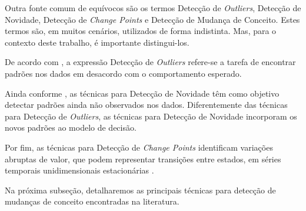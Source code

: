 \documentclass[qual, classic, a4paper]{ufbathesis}
\begin{document}
Outra fonte comum de equívocos são os termos Detecção de \textit{Outliers}, Detecção de Novidade, Detecção de \textit{Change Points} e Detecção de Mudança de Conceito.
Estes termos são, em muitos cenários, utilizados de forma indistinta.
Mas, para o contexto deste trabalho, é importante distingui-los.

De acordo com \cite{Chandola:2009:ADS:1541880.1541882}, a expressão Detecção de \textit{Outliers} refere-se a tarefa de encontrar padrões nos dados em desacordo com o comportamento esperado.

Ainda conforme \cite{Chandola:2009:ADS:1541880.1541882}, as técnicas para Detecção de Novidade têm como objetivo detectar padrões ainda não observados nos dados.
Diferentemente das técnicas para Detecção de \textit{Outliers}, as técnicas para Detecção de Novidade incorporam os novos padrões ao modelo de decisão.



Por fim, as técnicas para Detecção de \textit{Change Points} identificam variações abruptas de valor, que podem representar transições entre estados, em séries temporais unidimensionais estacionárias \cite{Aminikhanghahi:2017:SMT:3086013.3086037}.

Na próxima subseção, detalharemos as principais técnicas para detecção de mudanças de conceito encontradas na literatura.
\end{document}
